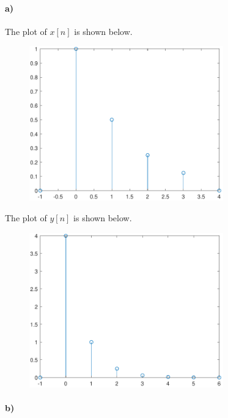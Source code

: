 \documentclass[12pt]{article}
\begin{document}
\paragraph{a)}

The plot of \(x[n]\) is shown below.
\begin{figure}[H]
    \begin{center}
        \includegraphics[width=3.3in]{problem2ax.pdf}
    \end{center}
\end{figure}
The plot of \(y[n]\) is shown below.
\begin{figure}[H]
    \begin{center}
        \includegraphics[width=3.3in]{problem2ay.pdf}
    \end{center}
\end{figure}

\paragraph{b)}
\end{document}
